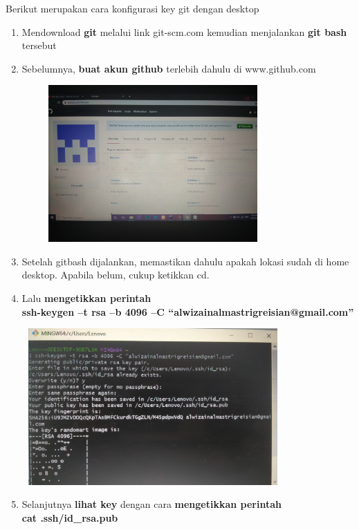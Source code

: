 \documentclass[a4paper, 12 pt]{article}
\begin{document}
		    \par Berikut merupakan cara konfigurasi key git dengan desktop
		        \begin{enumerate}
                    \item Mendownload \textbf{git} melalui link git-scm.com kemudian menjalankan \textbf{git bash} tersebut 
                    \item Sebelumnya, \textbf{buat akun github} terlebih dahulu di www.github.com
                        \begin{center}
                            \includegraphics[width=10cm,height=6cm]{IMG20200403013356}
	                    \end{center}
                    \item Setelah gitbash dijalankan, memastikan dahulu apakah lokasi sudah di home desktop. Apabila belum, cukup ketikkan cd.
                    \item Lalu \textbf{mengetikkan perintah} \\ \textbf{ssh-keygen –t rsa –b 4096 –C “alwizainalmastrigreisian@gmail.com”}
                        \begin{center}
		                    \includegraphics[width=10cm,height=6cm]{IMG20200403013921}
	                    \end{center}
                    \item Selanjutnya \textbf{lihat key} dengan cara \textbf{mengetikkan perintah} \\ \textbf{cat .ssh/id\_rsa.pub}

\end{enumerate}
\end{document}
